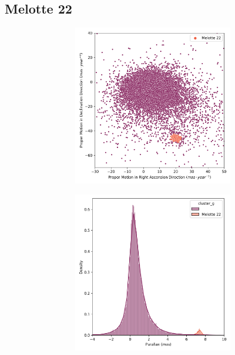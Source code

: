 \documentclass[11pt,a4paper,english,twocolumn]{article}
\begin{document}
\subsection{Melotte 22}
\label{sec:melotte22}

\begin{figure}[htbp]
  \centering
  \begin{subfigure}{\columnwidth}
    \centering
    \begin{subfigure}[t]{0.30\textwidth}
      \centering
      \includegraphics[width=\textwidth]{../figures/melotte_22/pm_melotte_22.png}
    \end{subfigure}
    \hfill
    \begin{subfigure}[t]{0.30\textwidth}
      \centering
      \includegraphics[width=\textwidth]{../figures/melotte_22/parallax_melotte_22.png}

\end{subfigure}
\end{subfigure}
\end{figure}
\end{document}
